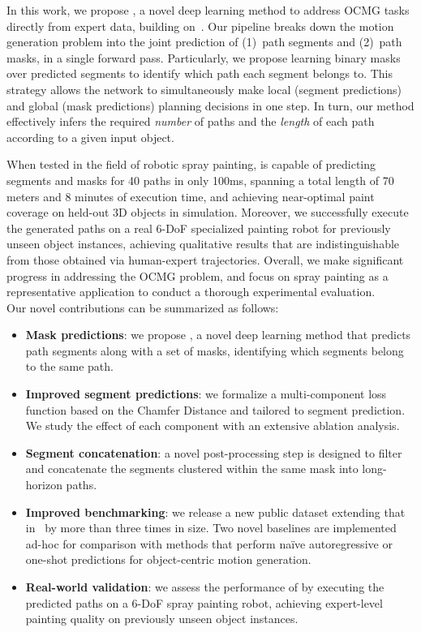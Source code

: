 In this work, we propose \emph{\ours}, a novel deep learning method to address OCMG tasks directly from expert data, building on~\cite{tiboni2023paintnet}.
Our pipeline breaks down the motion generation problem into the joint prediction of (1)~path segments and (2)~path masks, in a single forward pass. Particularly, we propose learning binary masks over predicted segments to identify which path each segment belongs to.
This strategy allows the network to simultaneously make local (segment predictions) and global (mask predictions) planning decisions in one step.
In turn, our method effectively infers the required \emph{number} of paths and the \emph{length} of each path according to a given input object.


When tested in the field of robotic spray painting, \ours is capable of predicting segments and masks for 40 paths in only 100ms, spanning a total length of 70 meters and 8 minutes of execution time, and achieving near-optimal paint coverage on held-out 3D objects in simulation.
%
Moreover, we successfully execute the generated paths on a real 6-DoF specialized painting robot for previously unseen object instances, achieving qualitative results that are indistinguishable from those obtained via human-expert trajectories. 
%
%
Overall, we make significant progress in addressing the OCMG problem, and focus on spray painting as a representative application to conduct a thorough experimental evaluation.\\

Our novel contributions can be summarized as follows:
\begin{itemize}[leftmargin=*,itemsep=2pt]
    \item \textbf{Mask predictions}:
        we propose \ours, a novel deep learning method that predicts path segments along with a set of masks, identifying which segments belong to the same path.
    \item \textbf{Improved segment predictions}:
        we formalize a multi-component loss function based on the Chamfer Distance and tailored to segment prediction. We study the effect of each component with an extensive ablation analysis.
    \item \textbf{Segment concatenation}:
        a novel post-processing step is designed to filter and concatenate the segments clustered within the same mask into long-horizon paths.
    \item \textbf{Improved benchmarking}:
        we release a new public dataset extending that in~\cite{tiboni2023paintnet} by more than three times in size.
        Two novel baselines are implemented ad-hoc for comparison with methods that perform na\"ive autoregressive or one-shot predictions for object-centric motion generation. 
    \item \textbf{Real-world validation}:
        we assess the performance of \ours by executing the predicted paths on a 6-DoF spray painting robot, achieving expert-level painting quality on previously unseen object instances. 
\end{itemize}